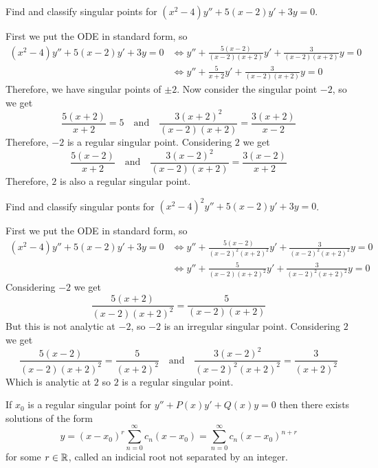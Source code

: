 \documentclass[notes]{subfiles}
\begin{document}
\begin{exercise}
    Find and classify singular points for $(x^2 - 4)y'' + 5(x - 2)y' + 3y = 0$.
\end{exercise}
\begin{solution}
    First we put the ODE in standard form, so
    \begin{align*}
        (x^2 - 4)y'' + 5(x - 2)y' + 3y = 0
        &\iff y'' + \frac{5(x - 2)}{(x - 2)(x + 2)}y' + \frac{3}{(x - 2)(x + 2)}y = 0 \\
        &\iff y'' + \frac{5}{x + 2}y' + \frac{3}{(x - 2)(x + 2)}y = 0
    \end{align*}
    Therefore, we have singular points of $\pm 2$. Now consider the singular point $-2$, so we get
    \[
        \frac{5(x + 2)}{x + 2} = 5 \quad \text{and} \quad \frac{3(x + 2)^2}{(x - 2)(x + 2)} = \frac{3(x + 2)}{x - 2}
    \]
    Therefore, $-2$ is a regular singular point.
    Considering $2$ we get
    \[
        \frac{5(x - 2)}{x + 2} \quad \text{and} \quad \frac{3(x - 2)^2}{(x - 2)(x + 2)} = \frac{3(x - 2)}{x + 2}
    \]
    Therefore, $2$ is also a regular singular point.
\end{solution}

\begin{exercise}
    Find and classify singular ponts for $(x^2 - 4)^2y'' + 5(x - 2)y' + 3y = 0$.
\end{exercise}
\begin{solution}
    First we put the ODE in standard form, so
    \begin{align*}
        (x^2 - 4)y'' + 5(x - 2)y' + 3y = 0
        &\iff y'' + \frac{5(x - 2)}{(x - 2)^2(x + 2)^2}y' + \frac{3}{(x - 2)^2(x + 2)^2}y = 0 \\
        &\iff y'' + \frac{5}{(x - 2)(x + 2)^2}y' + \frac{3}{(x - 2)^2(x + 2)^2}y = 0
    \end{align*}
    Considering $-2$ we get
    \[
        \frac{5(x + 2)}{(x - 2)(x + 2)^2} = \frac{5}{(x - 2)(x + 2)}
    \]
    But this is not analytic at $-2$, so $-2$ is an irregular singular point.
    Considering $2$ we get
    \[
        \frac{5(x - 2)}{(x - 2)(x + 2)^2} = \frac{5}{(x + 2)^2} \quad \text{and} \quad \frac{3(x - 2)^2}{(x - 2)^2(x + 2)^2} = \frac{3}{(x + 2)^2}
    \]
    Which is analytic at $2$ so $2$ is a regular singular point.
\end{solution}

\begin{theorem}
    If $x_0$ is a regular singular point for $y'' + P(x)y' + Q(x)y = 0$ then there exists solutions of the form
    \[
        y = (x - x_0)^r \sum_{n = 0}^\infty c_n(x - x_0) = \sum_{n = 0}^\infty c_n(x - x_0)^{n + r}
    \]
    for some $r \in \mathbb{R}$, called an indicial root not separated by an integer.
\end{theorem}
\end{document}
